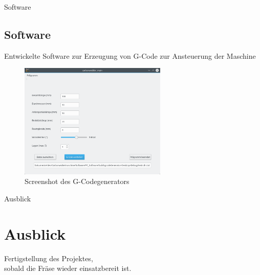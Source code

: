 \documentclass[12pt]{beamer}
\begin{document}
\begin{frame}{Software}
\subsection{Software}
Entwickelte Software zur Erzeugung von G-Code zur Ansteuerung der Maschine

\begin{figure}
	\includegraphics[width=7cm]{bilder/carbowickler_software.png}
	\caption{Screenshot des G-Codegenerators}
\end{figure}
\end{frame}

\begin{frame}{Ausblick}
\section{Ausblick}
\begin{center}
Fertigstellung des Projektes,\\sobald die Fräse wieder einsatzbereit ist.
\end{center} 
\end{frame}
\end{document}
